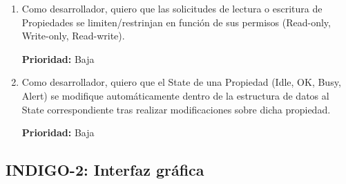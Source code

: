 \begin{enumerate}[label=\textbf{INDIGO.1.\arabic*}, leftmargin=10mm]
	\textbf{Prioridad:} Alta
	\item Como desarrollador, quiero que las solicitudes de lectura o escritura de Propiedades se limiten/restrinjan en función de sus permisos (Read-only, Write-only, Read-write).
	
	\textbf{Prioridad:} Baja
	\item Como desarrollador, quiero que el State de una Propiedad (Idle, OK, Busy, Alert) se modifique automáticamente dentro de la estructura de datos al State correspondiente tras realizar modificaciones sobre dicha propiedad.
	
	\textbf{Prioridad:} Baja
\end{enumerate}

\subsection{INDIGO-2: Interfaz gráfica}

